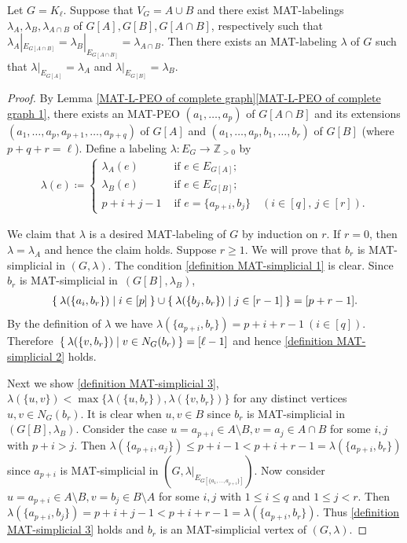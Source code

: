 \documentclass[ALCO, Unicode,published]{cedram}
\begin{document}
\begin{lemma}\label{merge}
Let $ G = K_{\ell} $. 
Suppose that $ V_{G} = A \cup B $ and there exist MAT-labelings $ \lambda_{A}, \lambda_{B}, \lambda_{A \cap B} $ of $ G[A], G[B], G[A\cap B] $, respectively such that $ \lambda_{A}|_{E_{G[A\cap B]}} = \lambda_{B}|_{E_{G[A\cap B]}} = \lambda_{A \cap B} $. 
Then there exists an MAT-labeling $ \lambda $ of $ G $ such that $ \lambda|_{E_{G[A]}} = \lambda_{A} $ and $ \lambda|_{E_{G[B]}} = \lambda_{B} $. 
\end{lemma}
\begin{proof}
By Lemma \ref{MAT-L-PEO of complete graph}\ref{MAT-L-PEO of complete graph 1}, there exists an MAT-PEO $ (a_{1}, \dots, a_{p}) $ of $ G[A \cap B] $ and its extensions $ (a_{1}, \dots, a_{p}, a_{p+1}, \dots, a_{p+q}) $ of $ G[A] $ and $ (a_{1}, \dots, a_{p}, b_{1}, \dots, b_{r}) $ of $ G[B] $ (where $p+q+r=\ell$). 
Define a labeling $ \lambda \colon E_{G} \to \mathbb{Z}_{>0} $ by 
\begin{align*}
\lambda(e) \coloneqq \begin{cases}
\lambda_{A}(e) & \text{ if } e \in E_{G[A]}; \\
\lambda_{B}(e) & \text{ if } e \in E_{G[B]}; \\
p + i + j - 1 & \text{ if } e = \{a_{p+i}, b_{j}\} \quad (i \in [q], \,  j \in[  r]). 
\end{cases}
\end{align*}

We claim that $ \lambda $ is a desired MAT-labeling of $ G $ by induction on $ r $. 
If $ r = 0 $, then $ \lambda = \lambda_{A} $ and hence the claim holds. 
Suppose $ r \geq 1 $. 
We will prove that $ b_{r} $ is MAT-simplicial in $ (G, \lambda) $. 
The condition \ref{definition MAT-simplicial 1} is clear. 
Since $ b_{r} $ is MAT-simplicial in~$ (G[B], \lambda_{B}) $, 
\begin{align*}
\Set{\lambda(\{a_{i}, b_{r}\}) | i \in [p ] } \cup \Set{\lambda(\{b_{j}, b_{r}\}) | j \in[  r-1]} =[ p+r-1]. 
\end{align*}
By the definition of $ \lambda $ we have $ \lambda(\{a_{p+i}, b_{r}\}) = p+i+r-1 \ (i \in [q]) $. 
Therefore~$ \Set{\lambda(\{v,b_{r}\}) | v \in N_{G}(b_{r})} = [\ell - 1] $ and hence \ref{definition MAT-simplicial 2} holds. 

Next we show \ref{definition MAT-simplicial 3}, \ie  $ \lambda(\{u,v\}) < \max\{\lambda(\{u,b_{r}\}), \lambda(\{v,b_{r}\})\} $ for any distinct vertices $ u,v \in N_{G}(b_{r}) $. 
It is clear when $ u,v \in B $ since $ b_{r} $ is MAT-simplicial in~$ (G[B], \lambda_{B}) $. 
Consider the case $ u=a_{p+i} \in A\setminus B, v=a_{j} \in A \cap B$ for some $ i,j $ with $ p+i > j $. 
Then $ \lambda(\{a_{p+i}, a_{j}\}) \leq p+i-1 < p+i+r-1 = \lambda(\{a_{p+i}, b_{r}\}) $ since $ a_{p+i} $ is MAT-simplicial in $ (G, \lambda|_{E_{G[\{a_{1}, \dots, a_{p+i}\}]}}) $. 
Now consider $ u=a_{p+i} \in A\setminus B, v = b_{j} \in B\setminus A $ for some $ i,j $ with $ 1 \leq i \leq q $ and $ 1 \leq j < r $. 
Then $ \lambda(\{a_{p+i}, b_{j}\}) = p+i+j-1 < p+i+r-1 = \lambda(\{a_{p+i}, b_{r}\}) $. 
Thus \ref{definition MAT-simplicial 3} holds and $ b_{r} $ is an MAT-simplicial vertex of $ (G, \lambda) $. 


\end{proof}
\end{document}
